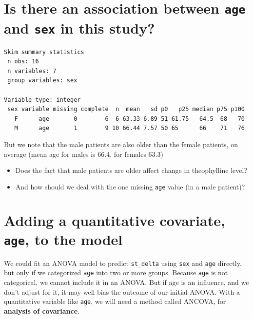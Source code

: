 \documentclass[]{book}
\newenvironment{Shaded}{\begin{snugshade}}{\end{snugshade}}
\newcommand{\KeywordTok}[1]{\textcolor[rgb]{0.13,0.29,0.53}{\textbf{#1}}}
\newcommand{\StringTok}[1]{\textcolor[rgb]{0.31,0.60,0.02}{#1}}
\newcommand{\OperatorTok}[1]{\textcolor[rgb]{0.81,0.36,0.00}{\textbf{#1}}}
\newcommand{\NormalTok}[1]{#1}
\providecommand{\tightlist}{%
  \setlength{\itemsep}{0pt}\setlength{\parskip}{0pt}}
\theoremstyle{definition}
\theoremstyle{definition}
\theoremstyle{definition}
\theoremstyle{remark}
\begin{document}
\section{\texorpdfstring{Is there an association between \texttt{age}
and \texttt{sex} in this
study?}{Is there an association between age and sex in this study?}}\label{is-there-an-association-between-age-and-sex-in-this-study}

\begin{Shaded}
\end{Shaded}

\begin{verbatim}
Skim summary statistics
 n obs: 16 
 n variables: 7 
 group variables: sex 

Variable type: integer 
 sex variable missing complete  n  mean   sd p0   p25 median p75 p100
   F      age       0        6  6 63.33 6.89 51 61.75   64.5  68   70
   M      age       1        9 10 66.44 7.57 50 65      66    71   76
\end{verbatim}

But we note that the male patients are also older than the female
patients, on average (mean age for males is 66.4, for females 63.3)

\begin{itemize}
\tightlist
\item
  Does the fact that male patients are older affect change in
  theophylline level?
\item
  And how should we deal with the one missing \texttt{age} value (in a
  male patient)?
\end{itemize}

\section{\texorpdfstring{Adding a quantitative covariate, \texttt{age},
to the
model}{Adding a quantitative covariate, age, to the model}}\label{adding-a-quantitative-covariate-age-to-the-model}

We could fit an ANOVA model to predict \texttt{st\_delta} using
\texttt{sex} and \texttt{age} directly, but only if we categorized
\texttt{age} into two or more groups. Because \texttt{age} is not
categorical, we cannot include it in an ANOVA. But if age is an
influence, and we don't adjust for it, it may well bias the outcome of
our initial ANOVA. With a quantitative variable like \texttt{age}, we
will need a method called ANCOVA, for \textbf{analysis of covariance}.
\end{document}
